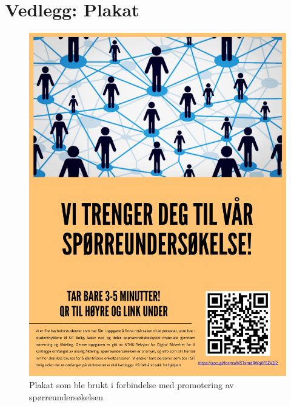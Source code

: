 \chapter{Vedlegg: Plakat}
\label{plakat}
\begin{figure}[H]
    \centering
    \includegraphics[scale=0.25]{case_1/bilder/plakat.pdf}
    \caption[Promoteringsplakat]{Plakat som ble brukt i forbindelse med promotering av spørreundersøkelsen}
    \label{fig:plakat}
\end{figure}
